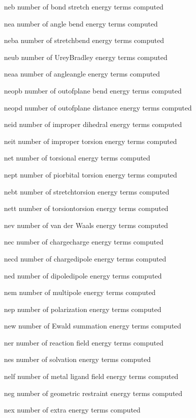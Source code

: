 \documentclass[letterpaper,11pt,english]{sphinxmanual}
\begin{document}
\begin{DUlineblock}{0em}
\item[] 
\item[] neb   number of bond stretch energy terms computed
\item[] nea   number of angle bend energy terms computed
\item[] neba  number of stretch\sphinxhyphen{}bend energy terms computed
\item[] neub  number of Urey\sphinxhyphen{}Bradley energy terms computed
\item[] neaa  number of angle\sphinxhyphen{}angle energy terms computed
\item[] neopb number of out\sphinxhyphen{}of\sphinxhyphen{}plane bend energy terms computed
\item[] neopd number of out\sphinxhyphen{}of\sphinxhyphen{}plane distance energy terms computed
\item[] neid  number of improper dihedral energy terms computed
\item[] neit  number of improper torsion energy terms computed
\item[] net   number of torsional energy terms computed
\item[] nept  number of pi\sphinxhyphen{}orbital torsion energy terms computed
\item[] nebt  number of stretch\sphinxhyphen{}torsion energy terms computed
\item[] nett  number of torsion\sphinxhyphen{}torsion energy terms computed
\item[] nev   number of van der Waals energy terms computed
\item[] nec   number of charge\sphinxhyphen{}charge energy terms computed
\item[] necd  number of charge\sphinxhyphen{}dipole energy terms computed
\item[] ned   number of dipole\sphinxhyphen{}dipole energy terms computed
\item[] nem   number of multipole energy terms computed
\item[] nep   number of polarization energy terms computed
\item[] new   number of Ewald summation energy terms computed
\item[] ner   number of reaction field energy terms computed
\item[] nes   number of solvation energy terms computed
\item[] nelf  number of metal ligand field energy terms computed
\item[] neg   number of geometric restraint energy terms computed
\item[] nex   number of extra energy terms computed
\end{DUlineblock}
\end{document}
